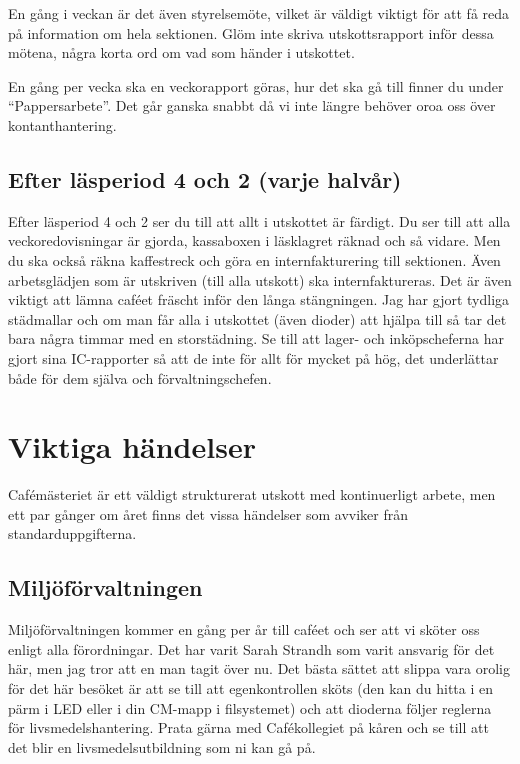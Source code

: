 \documentclass[10pt]{article}
\begin{document}
En gång i veckan är det även styrelsemöte, vilket är väldigt viktigt för att få reda på information om hela sektionen. Glöm inte skriva utskottsrapport inför dessa mötena, några korta ord om vad som händer i utskottet.

En gång per vecka ska en veckorapport göras, hur det ska gå till finner du under ``Pappersarbete''. Det går ganska snabbt då vi inte längre behöver oroa oss över kontanthantering.

\subsection{Efter läsperiod 4 och 2 (varje halvår)}
Efter läsperiod 4 och 2 ser du till att allt i utskottet är färdigt. Du ser till att alla veckoredovisningar är gjorda, kassaboxen i läsklagret räknad och så vidare. Men du ska också räkna kaffestreck och göra en internfakturering till sektionen. Även arbetsglädjen som är utskriven (till alla utskott) ska internfaktureras. Det är även viktigt att lämna caféet fräscht inför den långa stängningen. Jag har gjort tydliga städmallar och om man får alla i utskottet (även dioder) att hjälpa till så tar det bara några timmar med en storstädning. Se till att lager- och inköpscheferna har gjort sina IC-rapporter så att de inte för allt för mycket på hög, det underlättar både för dem själva och förvaltningschefen.

\section{Viktiga händelser}
Cafémästeriet är ett väldigt strukturerat utskott med kontinuerligt arbete, men ett par gånger om året finns det vissa händelser som avviker från standarduppgifterna.

\subsection{Miljöförvaltningen}
Miljöförvaltningen kommer en gång per år till caféet och ser att vi sköter oss enligt alla förordningar. Det har varit Sarah Strandh som varit ansvarig för det här, men jag tror att en man tagit över nu. Det bästa sättet att slippa vara orolig för det här besöket är att se till att egenkontrollen sköts (den kan du hitta i en pärm i LED eller i din CM-mapp i filsystemet) och att dioderna följer reglerna för livsmedelshantering. Prata gärna med Cafékollegiet på kåren och se till att det blir en livsmedelsutbildning som ni kan gå på.
\end{document}
